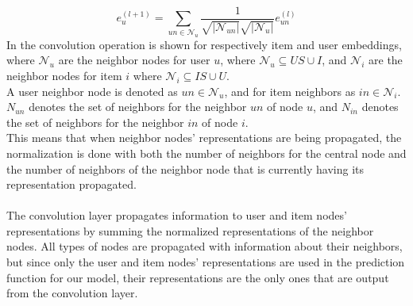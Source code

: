 \begin{equation}\label{eq:csgcn_is_gc_layer_user}
     e_{u}^{(l+1)}=\sum_{un\in \mathcal{N}_{u}}\frac{1}{\sqrt{|\mathcal{N}_{un}|} \sqrt{|\mathcal{N}_{u}|}}e_{un}^{(l)}
\end{equation}
In  the convolution operation is shown for respectively item and user embeddings, where $\mathcal{N}_{u}$ are the neighbor nodes for user $u$, where $\mathcal{N}_{u} \subseteq US \cup I$, and $\mathcal{N}_{i}$ are the neighbor nodes for item $i$ where $\mathcal{N}_{i} \subseteq IS \cup U$.\\
A user neighbor node is denoted as $un \in \mathcal{N}_{u}$, and for item neighbors as $in \in \mathcal{N}_{i}$.
$N_{un}$ denotes the set of neighbors for the neighbor $un$ of node $u$, and $N_{in}$ denotes the set of neighbors for the neighbor $in$ of node $i$.\\
This means that when neighbor nodes' representations are being propagated, the normalization is done with both the number of neighbors for the central node and the number of neighbors of the neighbor node that is currently having its representation propagated.
\\\\
The convolution layer propagates information to user and item nodes' representations by summing the normalized representations of the neighbor nodes.
All types of nodes are propagated with information about their neighbors, but since only the user and item nodes' representations are used in the prediction function for our model, their representations are the only ones that are output from the convolution layer.


